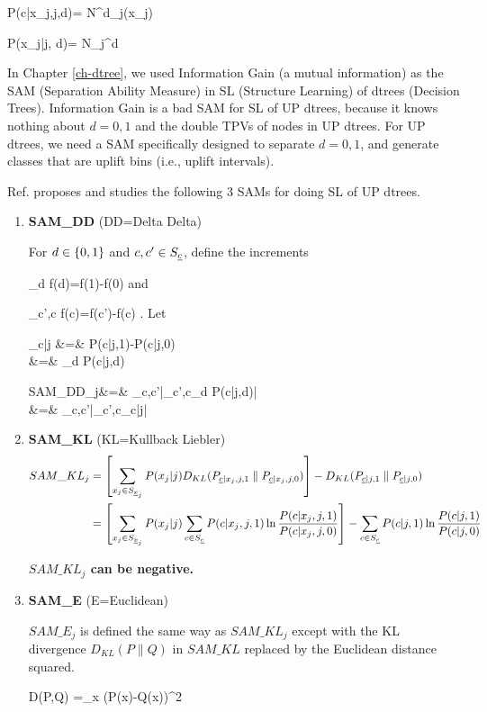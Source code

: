 \beq\color{blue}
P(c|x_j,j,d)=
{N^d_j(x_j)}
\label{eq-p-c-pre-laplace}
\eeq

\beq\color{blue}
P(x_j|j, d)=
{N_j^d}
\eeq


In Chapter
\ref{ch-dtree},
we used Information 
Gain
(a mutual information)
as the SAM (Separation Ability Measure)
in
SL (Structure Learning) 
of dtrees (Decision Trees).
Information Gain
is a bad
SAM for SL of UP dtrees,
because it knows nothing about
 $d=0,1$
and the double TPVs of nodes in UP dtrees.
For
UP dtrees,
we need a SAM specifically
designed to separate $d=0,1$, and generate 
classes that are
 uplift bins (i.e., uplift intervals).


Ref.\cite{jaros}
proposes and studies 
the following
3 SAMs 
for doing SL of UP dtrees.


\begin{enumerate}
\item{\bf SAM\_DD} (DD=Delta Delta)

For $d\in \{0,1\}$
and $c, c'\in S_{\underline{c}}$, define the increments

\beq
\partial_d f(d)=f(1)-f(0)
\eeq
and

\beq
\partial_{c',c} f(c)=f(c')-f(c)
\;.
\eeq
Let

\beqa
\Delta_{c|j} &=& P(c|j,1)-P(c|j,0)
\\
&=& \partial_d P(c|j,d)
\label{eq-delta-c-j}
\eeqa

\beqa
SAM\_DD_j&=& \max_{c,c'}|\partial_{c',c}\partial_d P(c|j,d)|
\\
&=&
\max_{c,c'}|\partial_{c',c}\Delta_{c|j}|
\eeqa

\item{\bf SAM\_KL} (KL=Kullback Liebler)
\begin{align}
SAM\_KL_j&=
\left[
\sum_{x_j\in S_{{\underline{x}}_j}}
P(x_j|j)
D_{KL}(P_{{\underline{c}}|x_j,j,1}\parallel P_{{\underline{c}}|x_j,j,0})
\right]
-
D_{KL}(P_{{\underline{c}}|j,1}\parallel P_{{\underline{c}}|j,0})
\\
&=
\left[
\sum_{x_j\in S_{{\underline{x}}_j}}
P(x_j|j)
 \sum_{c\in S_{\underline{c}}}P(c|x_j,j,1) 
\ln \frac{P(c|x_j,j,1) }{ P(c|x_j,j,0) }
\right]
-
\sum_{c\in S_{\underline{c}}} 
P(c|j,1) 
\ln \frac{P(c|j,1) }{ P(c|j,0) }
\label{eq-sam-kl}
\end{align}

{\bf $SAM\_KL_j$ can be negative.}

\item {\bf SAM\_E} (E=Euclidean)

$SAM\_E_j$ is defined the same way as $SAM\_KL_j$
except with 
the KL divergence $D_{KL}(P\parallel Q)$ 
in $SAM\_KL$ replaced 
by the Euclidean distance squared. 


\beq
D(P,Q) =\sum_x (P(x)-Q(x))^2
\eeq

\end{enumerate}

